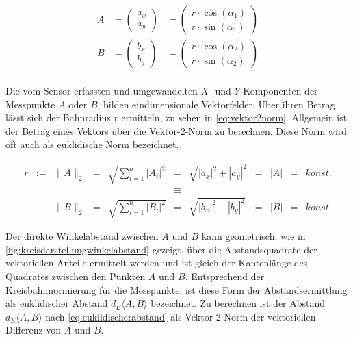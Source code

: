 \begin{equation}\label{eq:vektorenab}
\begin{aligned}
	A &= 
		\begin{pmatrix} 
			a_x \\
			a_y 
		\end{pmatrix}
	  &= 
		\begin{pmatrix} 
			r \cdot \cos(\alpha_1) \\
			r \cdot \sin(\alpha_1) 
		\end{pmatrix} \\
	B &=
		\begin{pmatrix} 
			b_x \\
			b_y 
		\end{pmatrix}
	  &= 
		\begin{pmatrix} 
			r \cdot \cos(\alpha_2) \\
			r \cdot \sin(\alpha_2) 
		\end{pmatrix} \\
\end{aligned}
\end{equation}


Die vom Sensor erfassten und umgewandelten $X$- und $Y$-Komponenten der Messpunkte $A$ oder $B$, bilden 
eindimensionale Vektorfelder. Über ihren Betrag lässt sich der Bahnradius $r$ ermitteln, zu sehen in 
\autoref{eq:vektor2norm}. Allgemein ist der Betrag eines Vektors über die Vektor-2-Norm zu berechnen. Diese Norm 
wird oft auch als euklidische Norm bezeichnet.


\begin{equation}\label{eq:vektor2norm}
	\begin{aligned}
	r &:= &\|A\|_2 &= &\sqrt{\sum_{i=1}^{n}|A_i|^2} &= &\sqrt{|a_x|^2 + |a_y|^2} &= &|A| &= &konst. \\
	  &&&&&\equiv \\
	  &   &\|B\|_2 &= &\sqrt{\sum_{i=1}^{n}|B_i|^2} &= &\sqrt{|b_x|^2 + |b_y|^2} &= &|B| &= &konst.
	\end{aligned}
\end{equation}


Der direkte Winkelabstand zwischen $A$ und $B$ kann geometrisch, wie in \autoref{fig:kreisdarstellungwinkelabstand} 
gezeigt, über die Abstandsquadrate der vektoriellen Anteile ermittelt werden und ist gleich der Kantenlänge des 
Quadrates zwischen den Punkten $A$ und $B$. Entsprechend der Kreisbahnnormierung für die Messpunkte, ist diese Form der 
Abstandsermittlung als euklidischer Abstand $d_E\langle A,B \rangle$ bezeichnet. Zu berechnen ist der Abstand 
$d_E\langle A,B \rangle$ nach \autoref{eq:euklidischerabstand} als Vektor-2-Norm der vektoriellen Differenz von $A$ und 
$B$.


